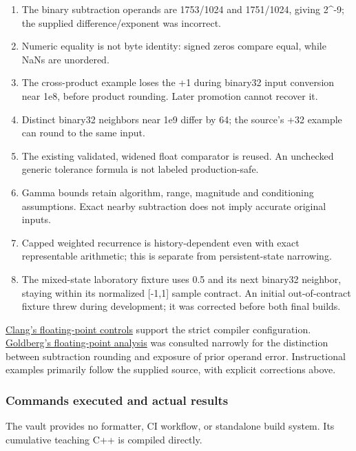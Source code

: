 \begin{enumerate}
\def\labelenumi{\arabic{enumi}.}
\tightlist
\item
  The binary subtraction operands are 1753/1024 and 1751/1024, giving 2\^{}-9; the supplied difference/exponent was incorrect.
\item
  Numeric equality is not byte identity: signed zeros compare equal, while NaNs are unordered.
\item
  The cross-product example loses the +1 during binary32 input conversion near 1e8, before product rounding. Later promotion cannot recover it.
\item
  Distinct binary32 neighbors near 1e9 differ by 64; the source's +32 example can round to the same input.
\item
  The existing validated, widened float comparator is reused. An unchecked generic tolerance formula is not labeled production-safe.
\item
  Gamma bounds retain algorithm, range, magnitude and conditioning assumptions. Exact nearby subtraction does not imply accurate original inputs.
\item
  Capped weighted recurrence is history-dependent even with exact representable arithmetic; this is separate from persistent-state narrowing.
\item
  The mixed-state laboratory fixture uses 0.5 and its next binary32 neighbor, staying within its normalized {[}-1,1{]} sample contract. An initial out-of-contract fixture threw during development; it was corrected before both final builds.
\end{enumerate}

\href{https://clang.llvm.org/docs/UsersManual.html\#controlling-floating-point-behavior}{Clang's floating-point controls} support the strict compiler configuration. \href{https://docs.oracle.com/cd/E19957-01/806-3568/ncg_goldberg.html}{Goldberg's floating-point analysis} was consulted narrowly for the distinction between subtraction rounding and exposure of prior operand error. Instructional examples primarily follow the supplied source, with explicit corrections above.

\subsubsection{Commands executed and actual results}\label{appendix-a103e7846d21-commands-executed-and-actual-results}

The vault provides no formatter, CI workflow, or standalone build system. Its cumulative teaching C++ is compiled directly.

